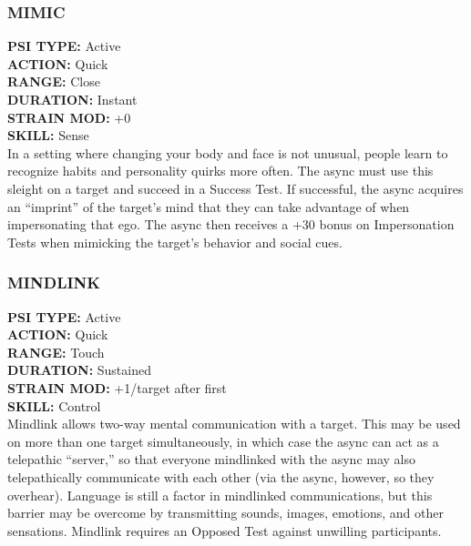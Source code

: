 \subsubsection{MIMIC} \textbf{PSI TYPE:} Active \\ \textbf{ACTION:} Quick \\ \textbf{RANGE:} Close \\ \textbf{DURATION:} Instant \\ \textbf{STRAIN MOD:} +0 \\ \textbf{SKILL:} Sense\\ In a setting where changing your body and face is not unusual, people learn to recognize habits and personality quirks more often. The async must use this sleight on a target and succeed in a Success Test. If successful, the async acquires an “imprint” of the target’s mind that they can take advantage of when impersonating that ego. The async then receives a +30 bonus on Impersonation Tests when mimicking the target’s behavior and social cues. 

\subsubsection{MINDLINK} \textbf{PSI TYPE:} Active \\ \textbf{ACTION:} Quick \\ \textbf{RANGE:} Touch \\ \textbf{DURATION:} Sustained \\ \textbf{STRAIN MOD:} +1/target after first \\ \textbf{SKILL:} Control\\ Mindlink allows two-way mental communication with a target. This may be used on more than one target simultaneously, in which case the async can act as a telepathic “server,” so that everyone mindlinked with the async may also telepathically communicate with each other (via the async, however, so they overhear). Language is still a factor in mindlinked communications, but this barrier may be overcome by transmitting sounds, images, emotions, and other sensations. Mindlink requires an Opposed Test against unwilling participants. 

